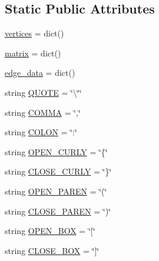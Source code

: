 \subsection*{Static Public Attributes}
\begin{DoxyCompactItemize}
\item 
\mbox{\hyperlink{class_bridges_1_1_graph_adj_matrix_1_1_graph_adj_matrix_a05162a3310d30fe9ee83c8d708ebff53}{vertices}} = dict()
\item 
\mbox{\hyperlink{class_bridges_1_1_graph_adj_matrix_1_1_graph_adj_matrix_acc32bd367ece4e1ae735f981f27f2074}{matrix}} = dict()
\item 
\mbox{\hyperlink{class_bridges_1_1_graph_adj_matrix_1_1_graph_adj_matrix_ae2ef09cf68331009f52c88f598776b77}{edge\+\_\+data}} = dict()
\item 
string \mbox{\hyperlink{class_bridges_1_1_graph_adj_matrix_1_1_graph_adj_matrix_aad5594a6c184b153400b3f411146644b}{Q\+U\+O\+TE}} = \char`\"{}\textbackslash{}\char`\"{}\char`\"{}
\item 
string \mbox{\hyperlink{class_bridges_1_1_graph_adj_matrix_1_1_graph_adj_matrix_a828653db54670bf3da9f725f1e8b736f}{C\+O\+M\+MA}} = \char`\"{},\char`\"{}
\item 
string \mbox{\hyperlink{class_bridges_1_1_graph_adj_matrix_1_1_graph_adj_matrix_a6415f8e168c205e6ada78ac07b2f18f7}{C\+O\+L\+ON}} = \char`\"{}\+:\char`\"{}
\item 
string \mbox{\hyperlink{class_bridges_1_1_graph_adj_matrix_1_1_graph_adj_matrix_a4f407fe6617f2988b5db449380f7077e}{O\+P\+E\+N\+\_\+\+C\+U\+R\+LY}} = \char`\"{}\{\char`\"{}
\item 
string \mbox{\hyperlink{class_bridges_1_1_graph_adj_matrix_1_1_graph_adj_matrix_ad27d638fec7c9bf57e7b94682ad86e2d}{C\+L\+O\+S\+E\+\_\+\+C\+U\+R\+LY}} = \char`\"{}\}\char`\"{}
\item 
string \mbox{\hyperlink{class_bridges_1_1_graph_adj_matrix_1_1_graph_adj_matrix_a952d2c21f82d0ce076778fb545c23a55}{O\+P\+E\+N\+\_\+\+P\+A\+R\+EN}} = \char`\"{}(\char`\"{}
\item 
string \mbox{\hyperlink{class_bridges_1_1_graph_adj_matrix_1_1_graph_adj_matrix_a610129cf7cc519c991029d3ca1c8271f}{C\+L\+O\+S\+E\+\_\+\+P\+A\+R\+EN}} = \char`\"{})\char`\"{}
\item 
string \mbox{\hyperlink{class_bridges_1_1_graph_adj_matrix_1_1_graph_adj_matrix_a4a85971973e325359a88a616a1a40e4b}{O\+P\+E\+N\+\_\+\+B\+OX}} = \char`\"{}\mbox{[}\char`\"{}
\item 
string \mbox{\hyperlink{class_bridges_1_1_graph_adj_matrix_1_1_graph_adj_matrix_a4d92a6f7675d067d79b39029a13a0372}{C\+L\+O\+S\+E\+\_\+\+B\+OX}} = \char`\"{}\mbox{]}\char`\"{}
\end{DoxyCompactItemize}


